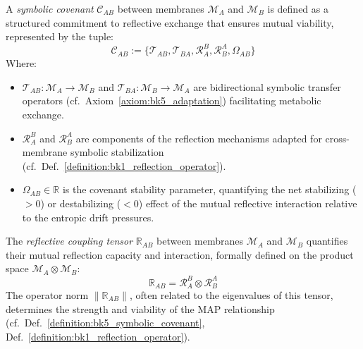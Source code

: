 \begin{definition}
\label{definition:bk5_symbolic_covenant}
A \emph{symbolic covenant} $\mathcal{C}_{AB}$ between membranes $\mathscr{M}_A$ and $\mathscr{M}_B$ is defined as a structured commitment to reflective exchange that ensures mutual viability, represented by the tuple:
\begin{equation}
\mathcal{C}_{AB} := \{\mathcal{T}_{AB}, \mathcal{T}_{BA}, \mathcal{R}_A^B, \mathcal{R}_B^A, \Omega_{AB}\}
\end{equation}
Where:
\begin{itemize}
  \item $\mathcal{T}_{AB}: \mathscr{M}_A \to \mathscr{M}_B$ and $\mathcal{T}_{BA}: \mathscr{M}_B \to \mathscr{M}_A$ are bidirectional symbolic transfer operators (cf.~Axiom~\ref{axiom:bk5_adaptation}) facilitating metabolic exchange.
  \item $\mathcal{R}_A^B$ and $\mathcal{R}_B^A$ are components of the reflection mechanisms adapted for cross-membrane symbolic stabilization (cf.~Def.~\ref{definition:bk1_reflection_operator}).
  \item $\Omega_{AB} \in \mathbb{R}$ is the covenant stability parameter, quantifying the net stabilizing ($>0$) or destabilizing ($<0$) effect of the mutual reflective interaction relative to the entropic drift pressures.
\end{itemize}
\end{definition}
\begin{definition}
\label{definition:bk5_reflective_coupling_tens}
The \emph{reflective coupling tensor} $\mathbb{R}_{AB}$ between membranes $\mathscr{M}_A$ and $\mathscr{M}_B$ quantifies their mutual reflection capacity and interaction, formally defined on the product space $\mathscr{M}_A \otimes \mathscr{M}_B$:
\begin{equation}
\mathbb{R}_{AB} = \mathcal{R}_A^B \otimes \mathcal{R}_B^A
\end{equation}
The operator norm $\|\mathbb{R}_{AB}\|$, often related to the eigenvalues of this tensor, determines the strength and viability of the MAP relationship (cf.~Def.~\ref{definition:bk5_symbolic_covenant}, Def.~\ref{definition:bk1_reflection_operator}).
\end{definition}

